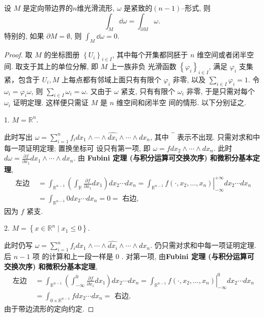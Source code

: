 \begin{theorem}
    设 $M$ 是定向带边界的$n$维光滑流形, $\omega$ 是紧致的$(n-1)$--形式, 则
    \[\int_M \dd \omega=\int_{\partial M} \omega.\]
    特别的, 如果 $\partial M=\emptyset$, 则 $\int_M\dd \omega=0$.
\end{theorem}
\begin{proof}
取 $M$ 的坐标图册 $\left\{U_i\right\}_{i \in I}$, 其中每个开集都同胚于 $n$ 维空间或者闭半空间. 取支于其上的单位分解, 即 $M$ 上一族非负 光滑函数 $\left\{\varphi_i\right\}_{i \in I}$, 满足 $\varphi_i$ 支集紧，包含于 $U_i, M$ 上每点都有邻域上面只有有限个 $\varphi_i$ 非零, 以及 $\sum_{i \in I} \varphi_i=1$. 令 $\omega_i=\varphi_i \omega$, 则 $\sum_{i \in I} \omega_i=\omega$. 又由于 $\omega$ 紧支, 只有有限个 $\omega_i$ 非零, 于是只需对每个 $\omega_i$ 证明定理. 这样便只需证 $M$ 是 $n$ 维空间和闭半空 间的情形. 以下分别证之.

1. $M=\mathbb{R}^n$. 

此时写出 $\omega=\sum_{i=1}^n f_i d x_1 \wedge \cdots \wedge \widehat{d x_i} \wedge \cdots \wedge d x_n$, 其中 $\widehat{\phantom{d}}$ 表示不出现. 只需对求和中每一项证明定理; 置换坐标可 设只有第一项, 即 $\omega=f d x_2 \wedge \cdots \wedge d x_n$. 此时 $d \omega=\frac{\partial f}{\partial x_1} d x_1 \wedge \cdots \wedge d x_n$. 由 \textbf{Fubini 定理 (与积分运算可交换次序) 和微积分基本定理},
\begin{align*}
\text { 左边 }& =\int_{\mathbb{R}^{n-1}}\left(\int_{\mathbb{R}} \frac{\partial f}{\partial x_1} d x_1\right) d x_2 \cdots d x_n=\left.\int_{\mathbb{R}^{n-1}} f\left(\cdot, x_2, \ldots, x_n\right)\right|_{-\infty} ^{+\infty} d x_2 \cdots d x_n\\
&=\int_{\mathbb{R}^{n-1}} 0 d x_2 \cdots d x_n=0=\text { 右边, }
\end{align*}
因为 $f$ 紧支.

2. $M=\left\{x \in \mathbb{R}^n \mid x_1 \leq 0\right\}$.  

此时仍写 $\omega=\sum_{i=1}^n f_i d x_1 \wedge \cdots \wedge \widehat{d x_i} \wedge \cdots \wedge d x_n$. 仍只需对求和中每一项证明定理. 后 $n-1$ 项 的计算和上一段一样是 0 . 对第一项, 由\textbf{Fubini 定理 (与积分运算可交换次序) 和微积分基本定理},
\begin{align*}
\text { 左边 }&=\int_{\mathbb{R}^{n-1}}\left(\int_{-\infty}^0 \frac{\partial f}{\partial x_1} d x_1\right) d x_2 \cdots d x_n=\left.\int_{\mathbb{R}^{n-1}} f\left(\cdot, x_2, \ldots, x_n\right)\right|_{-\infty} ^0 d x_2 \cdots d x_n\\
&=\int_{0 \times \mathbb{R}^{n-1}} f d x_2 \cdots d x_n=\text { 右边, }
\end{align*}
由于带边流形的定向约定.
\end{proof}

